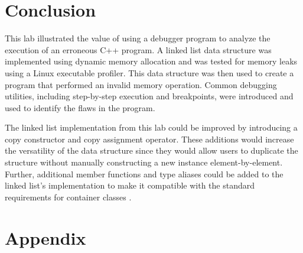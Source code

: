 \documentclass[11pt, letterpaper]{article} %
\begin{document}
\section*{Conclusion}

This lab illustrated the value of using a debugger program to analyze the execution of an erroneous C++ program. A linked list data structure was implemented using dynamic memory allocation and was tested for memory leaks using a Linux executable profiler. This data structure was then used to create a program that performed an invalid memory operation.  Common debugging utilities, including step-by-step execution and breakpoints, were introduced and used to identify the flaws in the program.


The linked list implementation from this lab could be improved by introducing a copy constructor and copy assignment operator. These additions would increase the versatility of the data structure since they would allow users to duplicate the structure without manually constructing a new instance element-by-element. Further, additional member functions and type aliases could be added to the linked list's implementation to make it compatible with the standard requirements for container classes \cite[\S26.2.1]{open-std-N4659}.

%
%


\clearpage
\section*{Appendix}
\renewcommand{\thelstlisting}{A.\arabic{lstlisting}}











\clearpage



\end{document}
